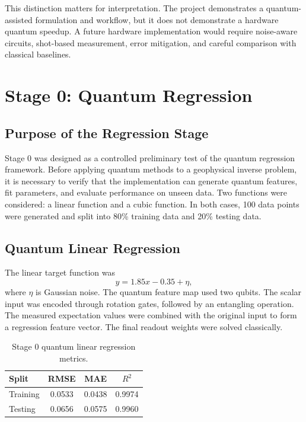 \documentclass[12pt,a4paper]{article}
\begin{document}
This distinction matters for interpretation. The project demonstrates a quantum-assisted formulation and workflow, but it does not demonstrate a hardware quantum speedup. A future hardware implementation would require noise-aware circuits, shot-based measurement, error mitigation, and careful comparison with classical baselines.

\clearpage
\section{Stage 0: Quantum Regression}
\subsection{Purpose of the Regression Stage}
Stage 0 was designed as a controlled preliminary test of the quantum regression framework. Before applying quantum methods to a geophysical inverse problem, it is necessary to verify that the implementation can generate quantum features, fit parameters, and evaluate performance on unseen data. Two functions were considered: a linear function and a cubic function. In both cases, 100 data points were generated and split into 80\% training data and 20\% testing data.

\subsection{Quantum Linear Regression}
The linear target function was
\begin{equation}
    y = 1.85x - 0.35 + \eta ,
\end{equation}
where $\eta$ is Gaussian noise. The quantum feature map used two qubits. The scalar input was encoded through rotation gates, followed by an entangling operation. The measured expectation values were combined with the original input to form a regression feature vector. The final readout weights were solved classically.

\begin{table}[H]
\centering
\caption{Stage 0 quantum linear regression metrics.}
\begin{tabular}{lccc}
\toprule
Split & RMSE & MAE & $R^2$ \\
\midrule
Training & 0.0533 & 0.0438 & 0.9974 \\
Testing  & 0.0656 & 0.0575 & 0.9960 \\
\bottomrule
\end{tabular}
\end{table}
\end{document}
